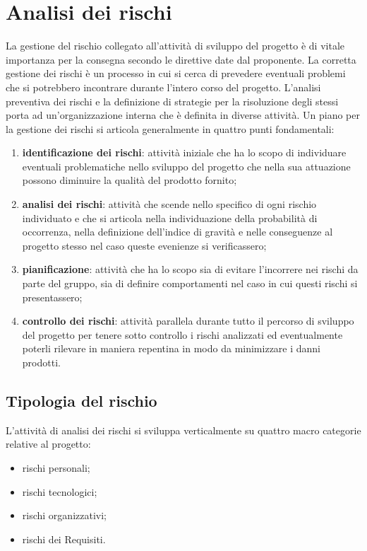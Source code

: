 \section{Analisi dei rischi} \label{_analisiDeiRischi}
	La gestione del rischio collegato all'attività di sviluppo del progetto è di vitale importanza per la consegna secondo le direttive date dal proponente. La corretta gestione dei rischi è un processo in cui si cerca di prevedere eventuali problemi che si potrebbero incontrare durante l'intero corso del progetto. L'analisi preventiva dei rischi e la definizione di strategie per la risoluzione degli stessi porta ad un'organizzazione interna che è definita in diverse attività.
	Un piano per la gestione dei rischi si articola generalmente in quattro punti fondamentali: 
\begin{enumerate}
	\item \textbf{identificazione dei rischi}: attività iniziale che ha lo scopo di individuare eventuali problematiche nello sviluppo del progetto che nella sua attuazione possono diminuire la qualità del prodotto fornito;
	\item \textbf{analisi dei rischi}: attività che scende nello specifico di ogni rischio individuato e che si articola nella individuazione della probabilità di occorrenza, nella definizione dell'indice di gravità e nelle conseguenze al progetto stesso nel caso queste evenienze si verificassero;
	\item \textbf{pianificazione}: attività che ha lo scopo sia di evitare l'incorrere nei rischi da parte del gruppo, sia di definire comportamenti nel caso in cui questi rischi si presentassero;
	\item \textbf{controllo dei rischi}: attività parallela durante tutto il percorso di sviluppo del progetto per tenere sotto controllo i rischi analizzati ed eventualmente poterli rilevare in maniera repentina in modo da minimizzare i danni prodotti.
\end{enumerate}

\subsection{Tipologia del rischio}
L'attività di analisi dei rischi si sviluppa verticalmente su quattro macro categorie relative al progetto:
\begin{itemize}
	\item rischi personali;
	\item rischi tecnologici;
	\item rischi organizzativi;
	\item rischi dei Requisiti.
\end{itemize}

